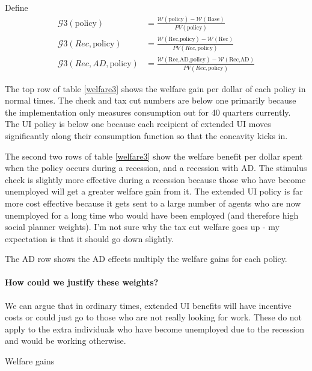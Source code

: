\documentclass[11pt]{article}
\begin{document}
	Define
	\begin{align}
	\mathcal{G}3(\text{policy}) &= \frac{\mathcal{W}(\text{policy}) - \mathcal{W}(\text{Base})}{PV(\text{policy})} \\
	\mathcal{G}3(Rec,\text{policy}) &= \frac{\mathcal{W}(\text{Rec,policy}) - \mathcal{W}(\text{Rec})}{PV(Rec,\text{policy})} \\
	\mathcal{G}3(Rec,AD,\text{policy}) &= \frac{\mathcal{W}(\text{Rec,AD,policy}) - \mathcal{W}(\text{Rec,AD})}{PV(Rec,\text{policy})}
	\end{align}
	
	The top row of table \ref{welfare3} shows the welfare gain per dollar of each policy in normal times. The check and tax cut numbers are below one primarily because the implementation only measures consumption out for 40 quarters currently. The UI policy is below one because each recipient of extended UI moves significantly along their consumption function so that the concavity kicks in.
	
	The second two rows of table \ref{welfare3} show the welfare benefit per dollar spent when the policy occurs during a recession, and a recession with AD. The stimulus check is slightly more effective during a recession because those who have become unemployed will get a greater welfare gain from it. The extended UI policy is far more cost effective because it gets sent to a large number of agents who are now unemployed for a long time who would have been employed (and therefore high social planner weights). I'm not sure why the tax cut welfare goes up - my expectation is that it should go down slightly.
	
	The AD row shows the AD effects multiply the welfare gains for each policy.
	
	\paragraph{How could we justify these weights?}
	We can argue that in ordinary times, extended UI benefits will have incentive costs or could just go to those who are not really looking for work. These do not apply to the extra individuals who have become unemployed due to the recession and would be working otherwise.
	\begin{table} 
	\center
	
	\caption{Welfare gains}
	\label{welfare3}
	\end{table}
	
	
\end{document}
